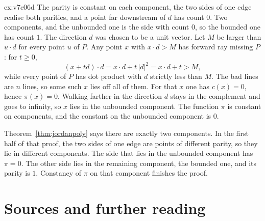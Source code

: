 \begin{solution}{ex:v7c06d}
\idea The parity is constant on each component, the two sides of one edge realise both parities, and a point far downstream of $d$ has count $0$. Two components, and the unbounded one is the side with count $0$, so the bounded one has count $1$.
\writeup The direction $d$ was chosen to be a unit vector. Let $M$ be larger than $u\cdot d$ for every point $u$ of $P$. Any point $x$ with $x\cdot d>M$ has forward ray missing $P$: for $t\ge0$,
\[
(x+td)\cdot d=x\cdot d+t\,|d|^2=x\cdot d+t>M,
\]
while every point of $P$ has dot product with $d$ strictly less than $M$. The bad lines are $n$ lines, so some such $x$ lies off all of them. For that $x$ one has $c(x)=0$, hence $\pi(x)=0$. Walking farther in the direction $d$ stays in the complement and goes to infinity, so $x$ lies in the unbounded component. The function $\pi$ is constant on components, and the constant on the unbounded component is $0$.

Theorem~\ref{thm:jordanpoly} says there are exactly two components. In the first half of that proof, the two sides of one edge are points of different parity, so they lie in different components. The side that lies in the unbounded component has $\pi=0$. The other side lies in the remaining component, the bounded one, and its parity is $1$. Constancy of $\pi$ on that component finishes the proof.
\end{solution}

\section*{Sources and further reading}

